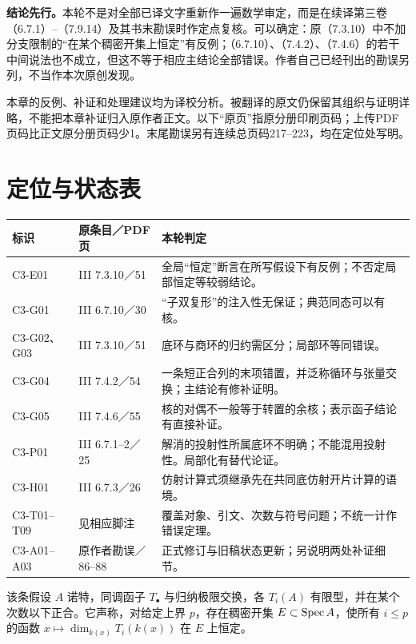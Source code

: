 \noindent\textbf{结论先行。}本轮不是对全部已译文字重新作一遍数学审定，而是在续译第三卷（6.7.1）--（7.9.14）及其书末勘误时作定点复核。可以确定：原（7.3.10）中不加分支限制的“在某个稠密开集上恒定”有反例；（6.7.10）、（7.4.2）、（7.4.6）的若干中间说法也不成立，但这不等于相应主结论全部错误。作者自己已经刊出的勘误另列，不当作本次原创发现。

本章的反例、补证和处理建议均为译校分析。被翻译的原文仍保留其组织与证明详略，不能把本章补证归入原作者正文。以下“原页”指原分册印刷页码；上传PDF页码比正文原分册页码少1。末尾勘误另有连续总页码217--223，均在定位处写明。

\section*{定位与状态表}
\begin{longtable}{@{}p{.17\linewidth}p{.24\linewidth}p{.51\linewidth}@{}}
\toprule 标识 & 原条目／PDF页 & 本轮判定\\\midrule\endhead
C3-E01 & III 7.3.10／51 & 全局“恒定”断言在所写假设下有反例；不否定局部恒定等较弱结论。\\
C3-G01 & III 6.7.10／30 & “子双复形”的注入性无保证；典范同态可以有核。\\
C3-G02、G03 & III 7.3.10／51 & 底环与商环的归约需区分；局部环等同错误。\\
C3-G04 & III 7.4.2／54 & 一条短正合列的末项错置，并泛称循环与张量交换；主结论有修补证明。\\
C3-G05 & III 7.4.6／55 & 核的对偶不一般等于转置的余核；表示函子结论有直接补证。\\
C3-P01 & III 6.7.1--2／25 & 解消的投射性所属底环不明确；不能混用投射性。局部化有替代论证。\\
C3-H01 & III 6.7.3／26 & 仿射计算式须继承先在共同底仿射开片计算的语境。\\
C3-T01--T09 & 见相应脚注 & 覆盖对象、引文、次数与符号问题；不统一计作错误定理。\\
C3-A01--A03 & 原作者勘误／86--88 & 正式修订与旧稿状态更新；另说明两处补证细节。\\
\bottomrule
\end{longtable}

该条假设 $A$ 诺特，同调函子 $T_\bullet$ 与归纳极限交换，各 $T_i(A)$ 有限型，并在某个次数以下正合。它声称，对给定上界 $p$，存在稠密开集 $E\subset\operatorname{Spec} A$，使所有 $i\leq p$ 的函数 $x\mapsto\dim_{k(x)}T_i(k(x))$ 在 $E$ 上恒定。


